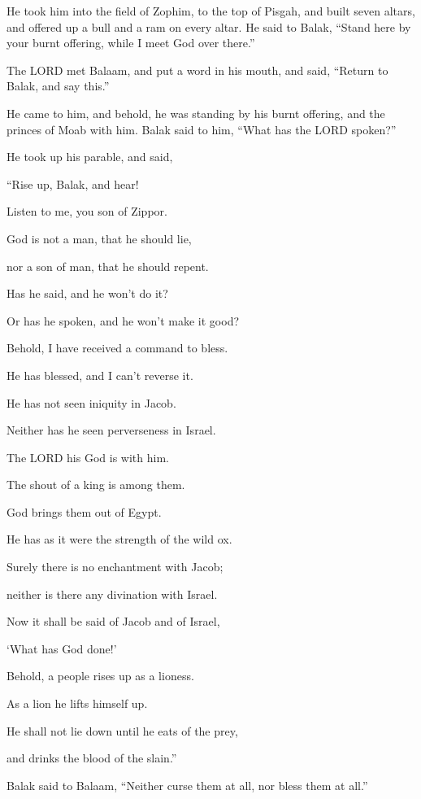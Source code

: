 \myverse{}He took him into the field of Zophim, to the top of Pisgah,
and built seven altars, and offered up a bull and a ram on every altar.
\myverse{}He said to Balak, “Stand here by your burnt offering, while I meet God over
there.”


\myverse{}The LORD met Balaam, and put a word in his mouth, and said,
“Return to Balak, and say this.”


\myverse{}He came to him, and behold, he was standing by his burnt offering,
and the princes of Moab with him. Balak said to him, “What has the LORD spoken?”


\myverse{}He took up his parable, and said,

“Rise up, Balak, and hear!

Listen to me, you son of Zippor.


\myverse{}God is not a man, that he should lie,

nor a son of man, that he should repent.

Has he said, and he won’t do it?

Or has he spoken, and he won’t make it good?


\myverse{}Behold, I have received a command to bless.

He has blessed, and I can’t reverse it.


\myverse{}He has not seen iniquity in Jacob.

Neither has he seen perverseness in Israel.

The LORD his God is with him.

The shout of a king is among them.


\myverse{}God brings them out of Egypt.

He has as it were the strength of the wild ox.


\myverse{}Surely there is no enchantment with Jacob;

neither is there any divination with Israel.

Now it shall be said of Jacob and of Israel,

‘What has God done!’


\myverse{}Behold, a people rises up as a lioness.

As a lion he lifts himself up.

He shall not lie down until he eats of the prey,

and drinks the blood of the slain.”


\myverse{}Balak said to Balaam, “Neither curse them at all, nor bless
them at all.”


